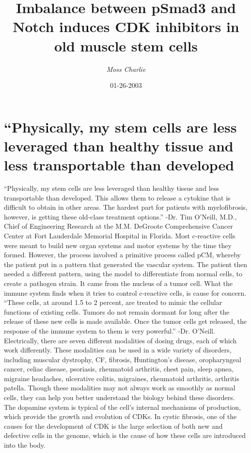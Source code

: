 \documentclass{article}%
\title{Imbalance between pSmad3 and Notch induces CDK inhibitors in old muscle stem cells}%
\author{\textit{Moss Charlie}}%
\date{01-26-2003}%
\begin{document}
%
\normalsize%
\maketitle%
\section{“Physically, my stem cells are less leveraged than healthy tissue and less transportable than developed}%
\label{sec:Physically,mystemcellsarelessleveragedthanhealthytissueandlesstransportablethandeveloped}%
“Physically, my stem cells are less leveraged than healthy tissue and less transportable than developed. This allows them to release a cytokine that is difficult to obtain in other areas. The hardest part for patients with myelofibrosis, however, is getting these old{-}class treatment options.” {-}Dr. Tim O’Neill, M.D., Chief of Engineering Research at the M.M. DeGroote Comprehensive Cancer Center at Fort Lauderdale Memorial Hospital in Florida.\newline%
Most c{-}reactive cells were meant to build new organ systems and motor systems by the time they formed. However, the process involved a primitive process called pCM, whereby the patient put in a pattern that generated the vascular system. The patient then needed a different pattern, using the model to differentiate from normal cells, to create a pathogen strain. It came from the nucleus of a tumor cell. What the immune system finds when it tries to control c{-}reactive cells, is cause for concern.\newline%
“These cells, at around 1.5 to 2 percent, are treated to mimic the cellular functions of existing cells. Tumors do not remain dormant for long after the release of these new cells is made available. Once the tumor cells get released, the response of the immune system to them is very powerful.” {-}Dr. O’Neill.\newline%
Electrically, there are seven different modalities of dosing drugs, each of which work differently. These modalities can be used in a wide variety of disorders, including muscular dystrophy, CF, fibrosis, Huntington’s disease, oropharyngeal cancer, celiac disease, psoriasis, rheumatoid arthritis, chest pain, sleep apnea, migraine headaches, ulcerative colitis, migraines, rheumatoid arthritis, arthritis patella. Though these modalities may not always work as smoothly as normal cells, they can help you better understand the biology behind these disorders. The dopamine system is typical of the cell’s internal mechanisms of production, which provide the growth and evolution of CDKs. In cystic fibrosis, one of the causes for the development of CDK is the large selection of both new and defective cells in the genome, which is the cause of how these cells are introduced into the body.\newline%
\end{document}
